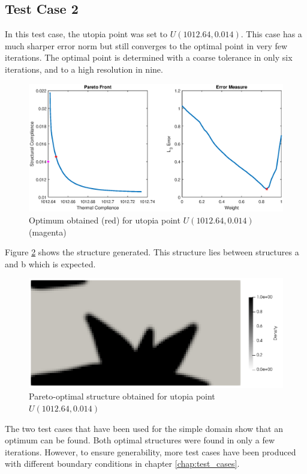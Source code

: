 \subsection*{Test Case 2}
In this test case, the utopia point was set to $U(1012.64, 0.014)$. This case has a much sharper error norm but still converges to the optimal point in very few iterations. The optimal point is determined with a coarse tolerance in only six iterations, and to a high resolution in nine.
\begin{figure}[ht]
    \centering
    \includegraphics[width=0.8\linewidth]{figures/chapter_5/ParetoOpt_w00854.eps}
    \caption{Optimum obtained (red) for utopia point $U(1012.64, 0.014)$ (magenta)}
    \label{fig:utopia_64_014}
\end{figure}

Figure \ref{fig:optimal_structure_2} shows the structure generated. This structure lies between structures a and b which is expected. 
\begin{figure}[ht]
    \centering
    \includegraphics[width=0.7\linewidth]{figures/chapter_5/ParetoOptimuim_Test2.png}
    \caption{Pareto-optimal structure obtained for utopia point $U(1012.64,0.014)$}
    \label{fig:optimal_structure_2}
\end{figure}

The two test cases that have been used for the simple domain show that an optimum can be found. Both optimal structures were found in only a few iterations. However, to ensure generability, more test cases have been produced with different boundary conditions in chapter \ref{chap:test_cases}.


